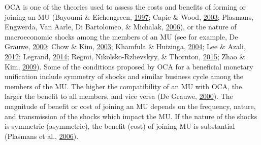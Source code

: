 \documentclass[]{article}
\begin{document}
OCA is one of the theories used to assess the costs and benefits of forming or joining  an MU (Bayoumi \& Eichengreen, \protect\hyperlink{ref-BAYOUMI1997761}{1997}; Capie \& Wood, \protect\hyperlink{ref-capie2003monetary}{2003}; Plasmans, Engwerda, Van Aarle, Di Bartolomeo, \& Michalak, \protect\hyperlink{ref-plasmans2006dynamic}{2006}), or the nature of macroeconomic shocks among the members of an MU (see for example, De Grauwe, \protect\hyperlink{ref-de2000monetary}{2000}; Chow \& Kim, \protect\hyperlink{ref-Chow2003}{2003}; Khamfula \& Huizinga, \protect\hyperlink{ref-khamfula2004southern}{2004}; Lee \& Azali, \protect\hyperlink{ref-lee2012east}{2012}; Legrand, \protect\hyperlink{ref-LEGRAND2014136}{2014}; Regmi, Nikolsko-Rzhevskyy, \& Thornton, \protect\hyperlink{ref-Regmi2015}{2015}; Zhao \& Kim, \protect\hyperlink{ref-Zhao2009}{2009}). Some of the conditions proposed by \ac{OCA} for a beneficial monetary unification include symmetry of shocks and similar business cycle among the members of the \ac{MU}. The higher the compatibility of an MU with \ac{OCA}, the larger the benefit to all members, and vice versa (De Grauwe, \protect\hyperlink{ref-de2000monetary}{2000}). The magnitude of benefit or cost of joining an MU depends on the frequency, nature, and transmission of the shocks which impact the \ac{MU}. If the nature of the shocks is symmetric (asymmetric), the benefit (cost) of joining \ac{MU} is substantial (Plasmans et al., \protect\hyperlink{ref-plasmans2006dynamic}{2006}).
\end{document}
